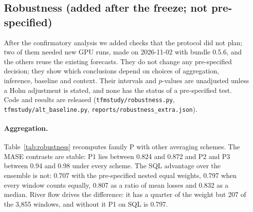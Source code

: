 \begin{table}[!htbp]
\centering
\caption{Calibration: mean empirical coverage of the central 80\% and 60\% intervals (protocol \S{}5.6), averaged over series (each series' coverage averaged over its windows and steps); descriptive. Tier P records the 80\% interval
only. TiRex-2 is not run beyond 320
steps, so its Tier C average covers 7{,}200 of the 7{,}600 tasks.}
\label{tab:calibration}
\small

\end{table}

\begin{table}[!htbp]
\centering
\caption{Secondary families (Holm within each family). S1: family P contrasts by domain; S2: Wikipedia memorisation probe; S3:
oracle future covariates; S4: TimesFM~3 restricted to the classical models' context.}
\label{tab:secondary}
\scriptsize

\end{table}

\subsection{Robustness (added after the freeze; not pre-specified)}
\label{sec:robustness}

After the confirmatory analysis we added checks that the protocol did not plan;
two of them needed new GPU runs, made on 2026-11-02 with bundle 0.5.6, and the others reuse the existing forecasts. They do not change
any pre-specified decision; they show which conclusions depend on choices of aggregation, inference, baseline and context. Their
intervals and $p$-values are unadjusted unless a Holm adjustment is stated, and none has the status of a pre-specified test. Code and results are released
(\texttt{tfmstudy/robustness.py}, \texttt{tfmstudy/alt\_baseline.py}, \texttt{reports/robustness\_extra.json}).

\paragraph{Aggregation.} Table~\ref{tab:robustness} recomputes family P with other averaging schemes. The MASE contrasts are stable:
P1 lies between 0.824 and 0.872 and P2 and P3 between 0.94 and 0.98 under every scheme. The SQL advantage over the ensemble is not:
0.707 with the pre-specified nested equal weights, 0.797 when every window counts equally, 0.807 as a ratio of mean losses and
0.832 as a median. River flow drives the difference: it has a quarter of the weight but 207 of the 3{,}855 windows, and without it
P1 on SQL is 0.797.

